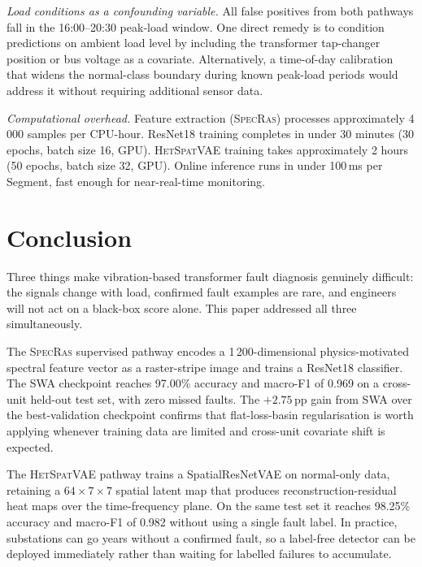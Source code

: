 \documentclass[preprint,12pt,3p]{elsarticle}
\newcommand{\zerone}{\textsc{SpecRas}\xspace}      %
\newcommand{\hetspatvae}{\textsc{HetSpatVAE}\xspace} %
\newcommand{\hczv}{\hetspatvae}                    %
\begin{document}
\textit{Load conditions as a confounding variable.}
All false positives from both pathways fall in the 16:00--20:30
peak-load window.
One direct remedy is to condition predictions on ambient load level
by including the transformer tap-changer position or bus voltage as
a covariate.
Alternatively, a time-of-day calibration that widens the normal-class
boundary during known peak-load periods would address it without
requiring additional sensor data.

\textit{Computational overhead.}
Feature extraction (\zerone) processes approximately 4\,000 samples
per CPU-hour.
ResNet18 training completes in under 30 minutes (30 epochs, batch
size 16, GPU).
\hczv training takes approximately 2 hours (50 epochs, batch size 32,
GPU).
Online inference runs in under 100\,ms per Segment, fast enough for
near-real-time monitoring.


\section{Conclusion}
\label{sec:conclusion}

Three things make vibration-based transformer fault diagnosis genuinely
difficult: the signals change with load, confirmed fault examples are
rare, and engineers will not act on a black-box score alone.
This paper addressed all three simultaneously.

The \zerone supervised pathway encodes a 1\,200-dimensional
physics-motivated spectral feature vector as a raster-stripe image and
trains a ResNet18 classifier.
The SWA checkpoint reaches 97.00\% accuracy and macro-F1 of
0.969 on a cross-unit held-out test set, with zero missed faults.
The $+2.75$\,pp gain from SWA over the best-validation checkpoint
confirms that flat-loss-basin regularisation is worth applying whenever
training data are limited and cross-unit covariate shift is expected.

The \hczv pathway trains a SpatialResNetVAE on normal-only data,
retaining a $64{\times}7{\times}7$ spatial latent map that produces
reconstruction-residual heat maps over the time-frequency plane.
On the same test set it reaches 98.25\% accuracy and macro-F1
of 0.982 without using a single fault label.
In practice, substations can go years without a confirmed fault, so a
label-free detector can be deployed immediately rather than waiting for
labelled failures to accumulate.
\end{document}
